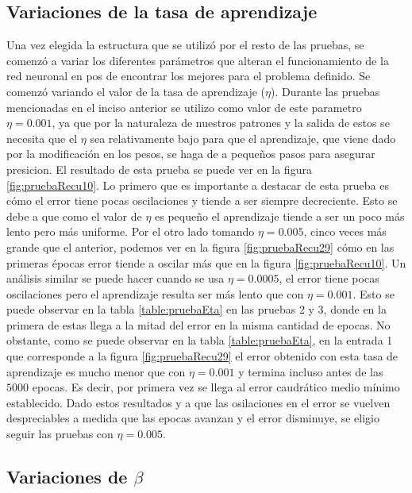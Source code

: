 \documentclass[11pt,a4paper]{article}
\begin{document}
\subsection{Variaciones de la tasa de aprendizaje}
Una vez elegida la estructura que se utilizó por el resto de las pruebas, se comenzó a variar los diferentes parámetros que alteran el funcionamiento de la red neuronal en pos de encontrar los mejores para el problema definido. Se comenzó variando el valor de la tasa de aprendizaje ($\eta$). Durante las pruebas mencionadas en el inciso anterior se utilizo como valor de este parametro $\eta = 0.001$, ya que por la naturaleza de nuestros patrones y la salida de estos se necesita que el $\eta$ sea relativamente bajo para que el aprendizaje, que viene dado por la modificación en los pesos, se haga de a pequeños pasos para asegurar presicion. El resultado de esta prueba se puede ver en la figura \ref{fig:pruebaRecu10}. Lo primero que es importante a destacar de esta prueba es cómo el error tiene pocas oscilaciones y tiende a ser siempre decreciente. Esto se debe a que como el valor de $\eta$ es pequeño el aprendizaje tiende a ser un poco más lento pero más uniforme. Por el otro lado tomando $\eta = 0.005$, cinco veces más grande que el anterior, podemos ver en la figura \ref{fig:pruebaRecu29} cómo en las primeras épocas error tiende a oscilar más que en la figura \ref{fig:pruebaRecu10}. Un análisis similar se puede hacer cuando se usa $\eta = 0.0005$, el error tiene pocas oscilaciones pero el aprendizaje resulta ser más lento que con $\eta =  0.001$. Esto se puede observar en la tabla \ref{table:pruebaEta} en las pruebas 2 y 3, donde en la primera de estas llega a la mitad del error en la misma cantidad de epocas. No obstante, como se puede observar en la tabla \ref{table:pruebaEta}, en la entrada 1 que corresponde a la figura \ref{fig:pruebaRecu29} el error obtenido con esta tasa de aprendizaje es mucho menor que con $\eta = 0.001$ y termina incluso antes de las $5000$ epocas. Es decir, por primera vez se llega al error caudrático medio mínimo establecido. Dado estos resultados y a que las osilaciones en el error se vuelven despreciables a medida que las epocas avanzan y el error disminuye, se eligio seguir las pruebas con $\eta = 0.005$. 

\subsection{Variaciones de \texorpdfstring{$\beta$}{\emph{beta}}}
\end{document}

